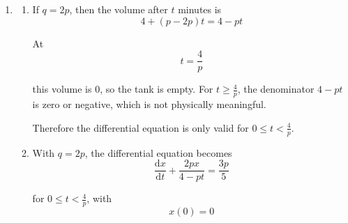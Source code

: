 \documentclass[leqno]{article}
\begin{document}
\begin{enumerate}[
  label=\textbf{\arabic*.},
  leftmargin=*,
  topsep=0pt,
  partopsep=0pt,
  parsep=0pt
]
\begin{djsSolution}
\begin{enumerate}[label=\textbf{(\alph*)}]
\begin{enumerate}[label=(\roman*)]
    Hence
    \[
    x=\frac{12}{5}+ce^{-pt/4}
    \]

    Using $x(0)=0$:
    \[
    0 = \frac{12}{5}+c
    \]

    so
    \[
    c=-\frac{12}{5}
    \]

    Therefore
    \[
    x=\frac{12}{5}\left(1-e^{-pt/4}\right)
    \]

    \item
    When $q=p$, the total volume stays constant at $4$ litres.

    After $4$ minutes, the liquid is $30\%$ concentrate, so the amount of concentrate is
    \[
    x=0.3\times 4=\frac{6}{5}
    \]

    Substitute $t=4$ into the formula from part (i):
    \[
    \frac{12}{5}\left(1-e^{-p}\right)=\frac{6}{5}
    \]

    Multiply through by $5$:
    \[
    12(1-e^{-p})=6
    \]

    Hence
    \begin{align*}
    1-e^{-p} &= \frac{1}{2} \\
    e^{-p} &= \frac{1}{2}
    \end{align*}

    Taking natural logarithms:
    \[
    -p=\ln\left(\frac{1}{2}\right)=-\ln 2
    \]

    so
    \[
    p=\ln 2
    \]

    Therefore $p=\ln 2\approx 0.693\,\mathrm{L\,min^{-1}}$.
  \end{enumerate}

  \item
  \begin{enumerate}[label=(\roman*)]
    \item
    If $q=2p$, then the volume after $t$ minutes is
    \[
    4+(p-2p)t=4-pt
    \]

    At
    \[
    t=\frac{4}{p}
    \]

    this volume is $0$, so the tank is empty. For $t\geq \frac{4}{p}$, the denominator $4-pt$ is zero or negative, which is not physically meaningful.

    Therefore the differential equation is only valid for $0\leq t<\frac{4}{p}$.

    \item
    With $q=2p$, the differential equation becomes
    \[
    \frac{\mathrm{d}x}{\mathrm{d}t}+\frac{2px}{4-pt}=\frac{3p}{5}
    \]

    for $0\leq t<\frac{4}{p}$, with
    \[
    x(0)=0
    \]


\end{enumerate}
\end{enumerate}
\end{djsSolution}
\end{enumerate}
\end{document}
